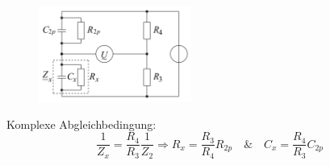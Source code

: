 \documentclass{article}
\begin{document}
\begin{itemize}
\begin{figure}[h]
\includegraphics[width=5cm]{pic/wienbr}
\end{figure}
Komplexe Abgleichbedingung:
\begin{equation}
\frac{1}{Z_x} = \frac{R_4}{R_3} \frac{1}{Z_2} \Rightarrow R_x = \frac{R_3}{R_4}R_{2p}\quad \& \quad C_x = \frac{R_4}{R_3}C_{2p}
\end{equation}



\end{itemize}
\end{document}

